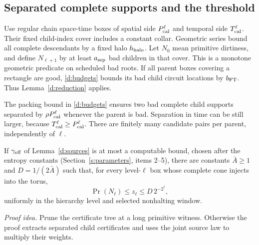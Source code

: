 \subsection{Separated complete supports and the threshold}\label{d:threshold-section}
Use regular chain space-time boxes of spatial side
\(P_{\rm cal}^{\ell}\) and temporal side \(T_{\rm cal}^{\ell}\).
Their fixed child-index cover includes a constant collar. Geometric
series bound all complete descendants by a fixed halo \(h_{\rm halo}\).
Let \(N_0\) mean primitive dirtiness, and define \(N_{\ell+1}\)
by at least \(a_{\rm sep}\) bad children in that cover. This is a
monotone geometric predicate on scheduled bad roots. If all parent
boxes covering a rectangle are good, \eqref{d:budgets} bounds its
bad child circuit locations by \(b_{\rm FT}\). Thus
Lemma~\ref{d:reduction} applies.

The packing bound in \eqref{d:budgets} ensures two bad complete child
supports separated by \(\rho P_{\rm cal}^{\ell}\) whenever the
parent is bad. Separation in time can be still larger, because
\(T_{\rm cal}^{\ell}\ge P_{\rm cal}^{\ell}\). There are finitely
many candidate pairs per parent, independently of \(\ell\).

\begin{lemma}\label{d:recursion}
If \(\gamma_{\rm eff}\) of Lemma~\ref{d:sources} is at most a computable
bound, chosen after the entropy constants (Section~\ref{s:parameters},
items 2--5), there are constants \(\bar A\ge1\) and \(D=1/(2\bar A)\)
such that, for every level-\(\ell\) box whose complete cone injects into
the torus,
\[
 \Pr(N_\ell)\le z_\ell\le D\,2^{-2^\ell},
\]
uniformly in the hierarchy level and selected nonhalting window.
\end{lemma}
\par\noindent\emph{Proof idea.} Prune the certificate tree at a long primitive witness. Otherwise the proof extracts separated child certificates and uses the joint source law to multiply their weights.

